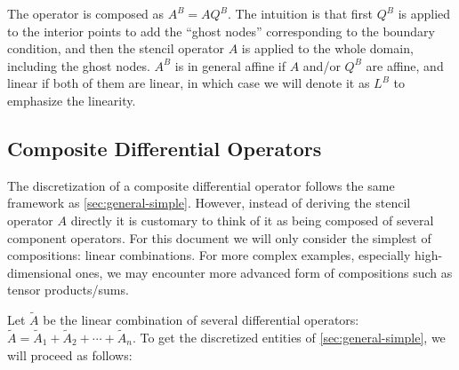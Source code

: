 \documentclass[11pt]{article}
\begin{document}
\begin{itemize}
	The operator is composed as $A^B = AQ^B$. The intuition is that first $Q^B$ is applied to the interior points to add the ``ghost nodes'' corresponding to the boundary condition, and then the stencil operator $A$ is applied to the whole domain, including the ghost nodes. $A^B$ is in general affine if $A$ and/or $Q^B$ are affine, and linear if both of them are linear, in which case we will denote it as $L^B$ to emphasize the linearity.
\end{itemize}

\subsection{Composite Differential Operators}\label{sec:general-composite}
The discretization of a composite differential operator follows the same framework as \ref{sec:general-simple}. However, instead of deriving the stencil operator $A$ directly it is customary to think of it as being composed of several component operators. For this document we will only consider the simplest of compositions: linear combinations. For more complex examples, especially high-dimensional ones, we may encounter more advanced form of compositions such as tensor products/sums.

Let $\tilde{A}$ be the linear combination of several differential operators: $\tilde{A} = \tilde{A}_1 + \tilde{A}_2 + \cdots + \tilde{A}_n$. To get the discretized entities of \ref{sec:general-simple}, we will proceed as follows:
\end{document}
